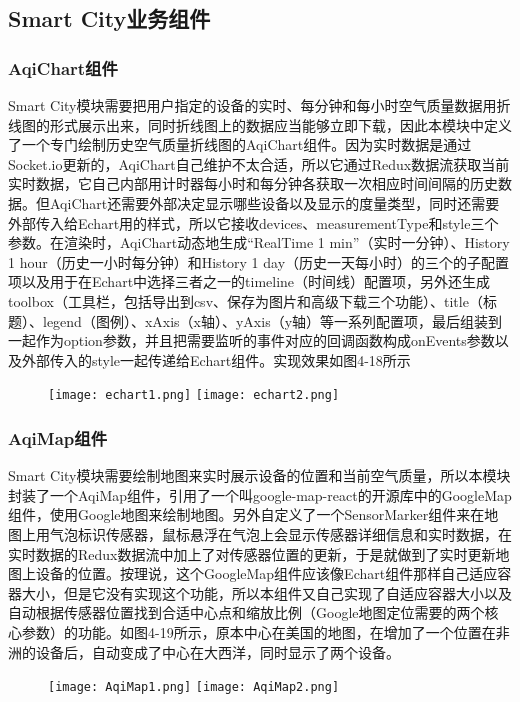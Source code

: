 \subsection{Smart City业务组件}
\subsubsection{AqiChart组件}
Smart City模块需要把用户指定的设备的实时、每分钟和每小时空气质量数据用折线图的形式展示出来，同时折线图上的数据应当能够立即下载，因此本模块中定义了一个专门绘制历史空气质量折线图的AqiChart组件。因为实时数据是通过Socket.io更新的，AqiChart自己维护不太合适，所以它通过Redux数据流获取当前实时数据，它自己内部用计时器每小时和每分钟各获取一次相应时间间隔的历史数据。但AqiChart还需要外部决定显示哪些设备以及显示的度量类型，同时还需要外部传入给Echart用的样式，所以它接收devices、measurementType和style三个参数。在渲染时，AqiChart动态地生成“RealTime 1 min”（实时一分钟）、History 1 hour（历史一小时每分钟）和History 1 day（历史一天每小时）的三个的子配置项以及用于在Echart中选择三者之一的timeline（时间线）配置项，另外还生成toolbox（工具栏，包括导出到csv、保存为图片和高级下载三个功能）、title（标题）、legend（图例）、xAxis（x轴）、yAxis（y轴）等一系列配置项，最后组装到一起作为option参数，并且把需要监听的事件对应的回调函数构成onEvents参数以及外部传入的style一起传递给Echart组件。实现效果如图4-18所示
\begin{figure}[!htp]
 \centering
 \texttt{[image: echart1.png]}
 \texttt{[image: echart2.png]}
\end{figure}
\subsubsection{AqiMap组件}
Smart City模块需要绘制地图来实时展示设备的位置和当前空气质量，所以本模块封装了一个AqiMap组件，引用了一个叫google-map-react的开源库中的GoogleMap组件，使用Google地图来绘制地图。另外自定义了一个SensorMarker组件来在地图上用气泡标识传感器，鼠标悬浮在气泡上会显示传感器详细信息和实时数据，在实时数据的Redux数据流中加上了对传感器位置的更新，于是就做到了实时更新地图上设备的位置。按理说，这个GoogleMap组件应该像Echart组件那样自己适应容器大小，但是它没有实现这个功能，所以本组件又自己实现了自适应容器大小以及自动根据传感器位置找到合适中心点和缩放比例（Google地图定位需要的两个核心参数）的功能。如图4-19所示，原本中心在美国的地图，在增加了一个位置在非洲的设备后，自动变成了中心在大西洋，同时显示了两个设备。
\begin{figure}[!htp]
 \centering
 \texttt{[image: AqiMap1.png]}
 \texttt{[image: AqiMap2.png]}
\end{figure}
